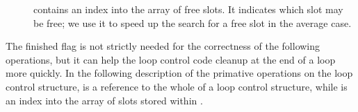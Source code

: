 \begin{description}
\item[]
contains an index into the array of free slots.
It indicates which slot may be free;
we use it to speed up the search for a free slot in the average case.

\end{description}

\noindent
The finished flag
is not strictly needed for the correctness of the following operations,
but it can help the loop control code cleanup at the end of a loop more quickly.
In the following description of the primative operations
on the loop control structure,
\LC is a reference to the whole of a loop control structure,
while \LCS is an index into the array of slots stored within \LC.

